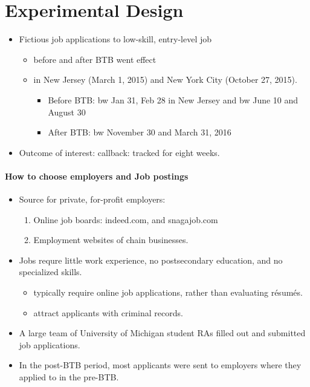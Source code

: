 \documentclass[../root]{subfiles}
\begin{document}
    \section{Experimental Design}

    \begin{itemize}
      \item Fictious job applications to low-skill, entry-level job
      \begin{itemize}
        \item before and after BTB went effect
        \item in New Jersey (March 1, 2015) and New York City (October 27, 2015).
        \begin{itemize}
          \item Before BTB: bw Jan 31, Feb 28 in New Jersey and bw June 10 and August 30
          \item After BTB: bw November 30 and March 31, 2016
        \end{itemize}
      \end{itemize}
      \item Outcome of interest: callback: tracked for eight weeks.
    \end{itemize}

    \paragraph{How to choose employers and Job postings}

    \begin{itemize}
      \item Source for private, for-profit employers:
      \begin{enumerate}
        \item Online job boards: indeed.com, and snagajob.com
        \item Employment websites of chain businesses.
      \end{enumerate}
      \item Jobs requre little work experience, no postsecondary education, and no specialized skills.
      \begin{itemize}
        \item typically require online job applications, rather than evaluating r\'{e}sum\'{e}s.
        \item attract applicants with criminal records.
      \end{itemize}
      \item A large team of University of Michigan student RAs filled out and submitted job applications.
      \item In the post-BTB period, most applicants were sent to employers where they applied to in the pre-BTB.
    \end{itemize}
\end{document}
